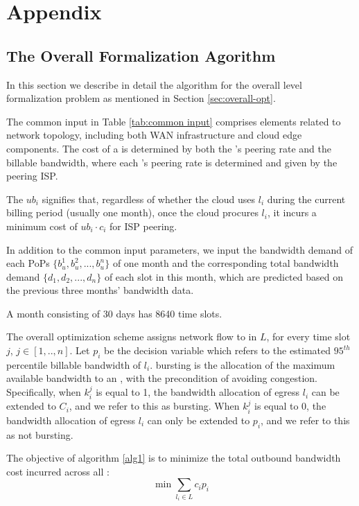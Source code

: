 \section{Appendix}
\subsection{The Overall Formalization Agorithm}
In this section we describe in detail the algorithm for the overall level formalization problem as mentioned in Section \ref{sec:overall-opt}.

The common input in Table \ref{tab:common input} comprises elements related to network topology, including both WAN infrastructure and cloud edge components. The cost of a {\egress} is determined by both the {\egress}'s peering rate and the billable bandwidth, where each {\egress}'s peering rate is determined and given by the peering ISP.

The $ub_i$ signifies that, regardless of whether the cloud uses {\egress} $l_i$ during the current billing period (usually one month), once the cloud procures {\egress} $l_i$, it incurs a minimum cost of $ub_i \cdot c_i$ for ISP peering. 

In addition to the common input parameters, we input the bandwidth demand of each PoPs $\{b^1_u, b^2_u, ..., b^n_u\}$ of one month and the corresponding total bandwidth demand $\{d_1, d_2,..., d_{n}\}$ of each slot in this month, which are predicted based on the previous three months' bandwidth data. 

 
A month consisting of 30 days has 8640 time slots.

The overall optimization scheme assigns network flow to {\egress} in $L$, for every time slot $j$, $j\in[1,..,n]$. Let $p_i$ be the decision variable which refers to the estimated $95^{th}$ percentile billable bandwidth of {\egress} $l_i$. {\Egress} bursting is the allocation of the maximum available bandwidth to an {\egress}, with the precondition of avoiding congestion. Specifically, when $k_{i}^j$ is equal to 1, the bandwidth allocation of egress $l_i$ can be extended to $C_i$, and we refer to this as bursting. When $k_{i}^j$ is equal to 0, the bandwidth allocation of egress $l_i$ can only be extended to $p_i$, and we refer to this as not bursting.



The objective of algorithm \ref{alg1} is to minimize the total outbound bandwidth cost incurred across all {\egresses}:
$$\min\sum_{l_i \in L} c_i p_i$$


